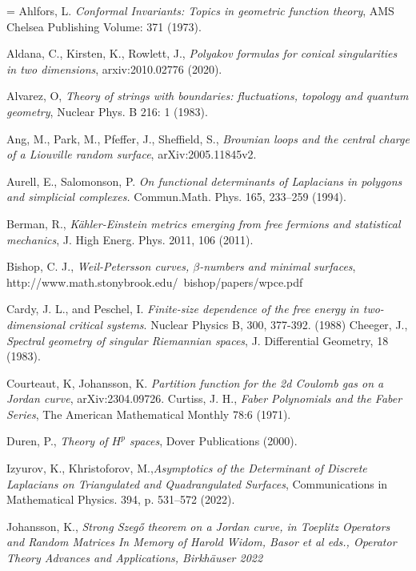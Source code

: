 \documentclass{article}
\numberwithin{equation}{section}
\numberwithin{figure}{section}
\theoremstyle{plain}
\theoremstyle{plain}
\numberwithin{thm}{section}
\theoremstyle{remark}
\begin{document}
\begin{thebibliography}{99}

\itemsep=\smallskipamount
{} Ahlfors, L. \emph{Conformal {I}nvariants: {T}opics in geometric function theory}, AMS Chelsea Publishing
Volume: 371 (1973).

 Aldana, C., Kirsten, K., Rowlett, J., \emph{Polyakov formulas for conical singularities in two dimensions}, arxiv:2010.02776 (2020).

 Alvarez, O, \emph{Theory of strings with boundaries: fluctuations, topology and quantum geometry}, Nuclear Phys. B 216: 1 (1983).

 Ang, M., Park, M., Pfeffer, J., Sheffield, S., \emph{Brownian loops and the central charge of a Liouville random surface}, arXiv:2005.11845v2.

 Aurell, E., Salomonson, P. \emph{On functional determinants of {L}aplacians in polygons and simplicial complexes.} Commun.Math. Phys. 165, 233–259 (1994).

 Berman, R., \emph{K\"ahler-Einstein metrics emerging from free fermions and statistical mechanics},  J. High Energ. Phys. 2011, 106 (2011).

 Bishop, C. J., \emph{Weil-Petersson curves, $\beta$-numbers and minimal surfaces}, \newline http://www.math.stonybrook.edu/~bishop/papers/wpce.pdf 

 Cardy, J. L., and Peschel, I. \emph{Finite-size dependence of the free energy in two-dimensional critical systems}. Nuclear Physics B, 300, 377-392. (1988)
 Cheeger, J., \emph{Spectral geometry of singular {R}iemannian spaces},  J. Differential Geometry, 18 (1983).

 Courteaut, K, Johansson, K. \emph{Partition function for the 2d Coulomb gas on a Jordan curve}, arXiv:2304.09726.
 Curtiss, J. H., \emph{Faber Polynomials and the Faber Series}, The American Mathematical Monthly 78:6 (1971).

 Duren, P., \emph{Theory of $H^p$ spaces}, Dover Publications (2000).

 Izyurov, K., Khristoforov, M.,\emph{Asymptotics of the Determinant of Discrete Laplacians on Triangulated and Quadrangulated Surfaces}, Communications in Mathematical Physics. 394, p. 531–572 (2022).

 Johansson, K., \it Strong Szeg\H{o} theorem on a Jordan curve\rm, in Toeplitz Operators and Random Matrices  In Memory of Harold Widom,  Basor et al eds., Operator Theory
Advances and Applications, Birkh\"auser 2022


\end{thebibliography}
\end{document}
